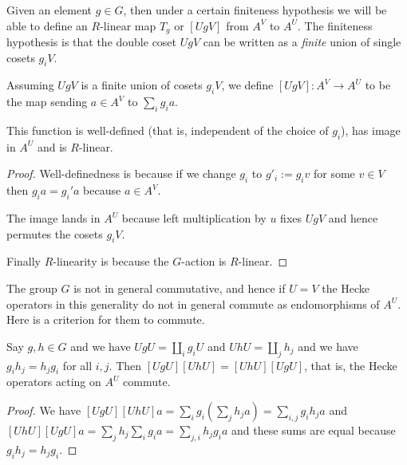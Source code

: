 Given an element $g\in G$, then under a certain finiteness hypothesis
we will be able to define an $R$-linear map $T_g$ or $[UgV]$
from $A^V$ to $A^U$. The finiteness hypothesis is that the
double coset $UgV$ can be written as a \emph{finite} union of single
cosets $g_iV$.

\begin{definition}
  \label{AbstractHeckeOperator.HeckeOperator_toFun}
  \leanok
  Assuming $UgV$ is a finite union of cosets $g_iV$,
  we define $[UgV]:A^V\to A^U$ to be the map sending $a\in A^V$
  to $\sum_i g_ia.$
\end{definition}

\begin{lemma}
  \label{AbstractHeckeOperator.HeckeOperator}
  \leanok
  This function is well-defined (that is, independent of the
  choice of $g_i$), has image in $A^U$ and is $R$-linear.
\end{lemma}
\begin{proof}
  \leanok
  Well-definedness is because if we change $g_i$ to $g'_i:=g_iv$
  for some $v\in V$ then $g_ia=g_i'a$ because $a\in A^V$.

  The image lands in $A^U$ because left multiplication by $u$
  fixes $UgV$ and hence permutes the cosets $g_iV$.

  Finally $R$-linearity is because the $G$-action is $R$-linear.
\end{proof}

The group $G$ is not in general commutative, and hence if $U=V$
the Hecke operators in this generality do not in general commute
as endomorphisms of $A^U$. Here is a criterion for
them to commute.

\begin{lemma}
  \label{AbstractHeckeOperator.comm}
  \leanok
  Say $g,h\in G$ and we have $UgU=\coprod_i g_iU$
  and $UhU=\coprod_j h_j$ and we have $g_ih_j=h_jg_i$ for all $i,j$.
  Then $[UgU][UhU]=[UhU][UgU]$, that is, the Hecke operators
  acting on $A^U$ commute.
\end{lemma}
\begin{proof}
  \leanok
  We have $[UgU][UhU]a=\sum_ig_i(\sum_jh_ja)=\sum_{i,j}g_ih_ja$
  and $[UhU][UgU]a=\sum_jh_j\sum_ig_ia=\sum_{j,i}h_jg_ia$ and these
  sums are equal because $g_ih_j=h_jg_i$.
\end{proof}

